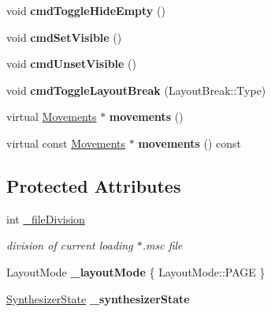 \begin{DoxyCompactItemize}
void {\bfseries cmd\+Toggle\+Hide\+Empty} ()
\item 
\mbox{\label{class_ms_1_1_score_abf267287811f5ea50cf1393fb46480a4}} 
void {\bfseries cmd\+Set\+Visible} ()
\item 
\mbox{\label{class_ms_1_1_score_ad4e0865836a18f7a49c7a97ed191e279}} 
void {\bfseries cmd\+Unset\+Visible} ()
\item 
\mbox{\label{class_ms_1_1_score_ad33df9d484f72d4cb751475a0e5f3190}} 
void {\bfseries cmd\+Toggle\+Layout\+Break} (Layout\+Break\+::\+Type)
\item 
\mbox{\label{class_ms_1_1_score_a2066b3224a23490004c66ebcd9c10440}} 
virtual \hyperlink{class_ms_1_1_movements}{Movements} $\ast$ {\bfseries movements} ()
\item 
\mbox{\label{class_ms_1_1_score_a70e4f423e79c31e1ef4aac10bef745cc}} 
virtual const \hyperlink{class_ms_1_1_movements}{Movements} $\ast$ {\bfseries movements} () const
\end{DoxyCompactItemize}
\subsection*{Protected Attributes}
\begin{DoxyCompactItemize}
\item 
\mbox{\label{class_ms_1_1_score_aa9e7711d9767cd7f2a1bae8ea6b70799}} 
int \hyperlink{class_ms_1_1_score_aa9e7711d9767cd7f2a1bae8ea6b70799}{\+\_\+file\+Division}
\begin{DoxyCompactList}\small\item\em division of current loading $\ast$.msc file \end{DoxyCompactList}\item 
\mbox{\label{class_ms_1_1_score_a0169fb17fae5207d537cb8f2c3a3951f}} 
Layout\+Mode {\bfseries \+\_\+layout\+Mode} \{ Layout\+Mode\+::\+P\+A\+GE \}
\item 
\mbox{\label{class_ms_1_1_score_af954720f93085f38895e4a8356a14793}} 
\hyperlink{class_ms_1_1_synthesizer_state}{Synthesizer\+State} {\bfseries \+\_\+synthesizer\+State}
\end{DoxyCompactItemize}

